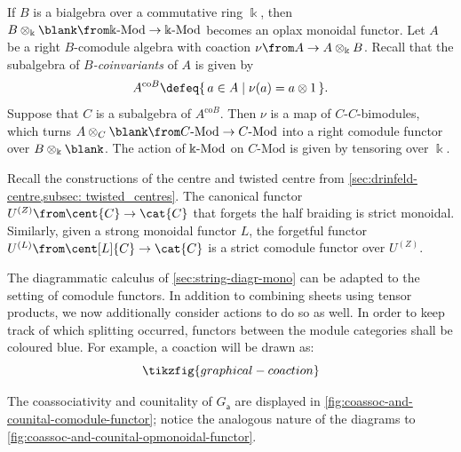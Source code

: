 \begin{example}\label{ex:comodule-algebra}
  If \(B\) is a bialgebra over a commutative ring \(\Bbbk\),
  then \(B \otimes_{\Bbbk} \blank \from \Bbbk\text{-Mod} \to \Bbbk\text{-Mod}\) becomes an oplax monoidal functor.
  Let \(A\) be a right \(B\)\hyp{}comodule algebra
  with coaction \(\nu \from A \to A \otimes_{\Bbbk} B\).
  Recall that the subalgebra of \emph{\(B\)-coinvariants} of \(A\) is given by
  \[
    A^{\mathrm{co}B} \defeq \{\, a \in A \mid \nu(a) = a \otimes 1 \,\}.
  \]
  Suppose that \(C\) is a subalgebra of \(A^{\mathrm{co}B}\).
  Then \(\nu\) is a map of \(C\)\hyp{}\(C\)\hyp{}bimodules,
  which turns \(A \otimes_{C} \blank \from C\text{-Mod} \to C\text{-Mod}\) into a right comodule functor over \(B \otimes_{\Bbbk} \blank\).
  The action of \(\Bbbk\textnormal{-Mod}\) on \(C\text{-Mod}\) is given by tensoring over \(\Bbbk\).
\end{example}

Recall the constructions of the centre and twisted centre from \cref{sec:drinfeld-centre,subsec: twisted_centres}.
The canonical functor \(U^{(Z)} \from \cent{C} \to \cat{C}\)
that forgets the half braiding is strict monoidal.
Similarly,
given a strong monoidal functor \(L\),
the forgetful functor \(U^{(L)} \from \cent[L]{C} \to \cat{C}\)
is a strict comodule functor over \(U^{(Z)}\).

\begin{remark}\label{rmk:graphical-comodule-functors}
  The diagrammatic calculus of \cref{sec:string-diagr-mono} can be adapted to the setting of comodule functors.
  In addition to combining sheets using tensor products,
  we now additionally consider actions to do so as well.
  In order to keep track of which splitting occurred,
  functors between the module categories shall be coloured blue.
  For example, a coaction will be drawn as:
  \[
    \tikzfig{graphical-coaction}
  \]

  The coassociativity and counitality of \(G_{\mathsf{a}}\) are displayed in \cref{fig:coassoc-and-counital-comodule-functor};
  notice the analogous nature of the diagrams to \cref{fig:coassoc-and-counital-opmonoidal-functor}.
  \begin{figure}[htbp]
    \centering
  \end{figure}
\end{remark}

